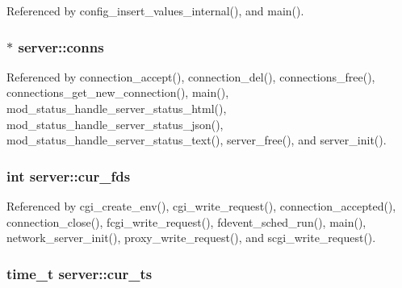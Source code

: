 Referenced by config\-\_\-insert\-\_\-values\-\_\-internal(), and main().

\hypertarget{structserver_aae05a2998939a5cf7fcf995f1fe4e413}{
\subsubsection[{conns}]{$\ast$ server\-::conns}}\label{structserver_aae05a2998939a5cf7fcf995f1fe4e413}


Referenced by connection\-\_\-accept(), connection\-\_\-del(), connections\-\_\-free(), connections\-\_\-get\-\_\-new\-\_\-connection(), main(), mod\-\_\-status\-\_\-handle\-\_\-server\-\_\-status\-\_\-html(), mod\-\_\-status\-\_\-handle\-\_\-server\-\_\-status\-\_\-json(), mod\-\_\-status\-\_\-handle\-\_\-server\-\_\-status\-\_\-text(), server\-\_\-free(), and server\-\_\-init().

\hypertarget{structserver_ae57e4289212df48f77aa63a2f5bc3a8e}{
\subsubsection[{cur\-\_\-fds}]{\setlength{\rightskip}{0pt plus 5cm}int server\-::cur\-\_\-fds}}\label{structserver_ae57e4289212df48f77aa63a2f5bc3a8e}


Referenced by cgi\-\_\-create\-\_\-env(), cgi\-\_\-write\-\_\-request(), connection\-\_\-accepted(), connection\-\_\-close(), fcgi\-\_\-write\-\_\-request(), fdevent\-\_\-sched\-\_\-run(), main(), network\-\_\-server\-\_\-init(), proxy\-\_\-write\-\_\-request(), and scgi\-\_\-write\-\_\-request().

\hypertarget{structserver_a04e46e7d58c9baa7cb27893c8f230ac7}{
\subsubsection[{cur\-\_\-ts}]{\setlength{\rightskip}{0pt plus 5cm}time\-\_\-t server\-::cur\-\_\-ts}}\label{structserver_a04e46e7d58c9baa7cb27893c8f230ac7}


